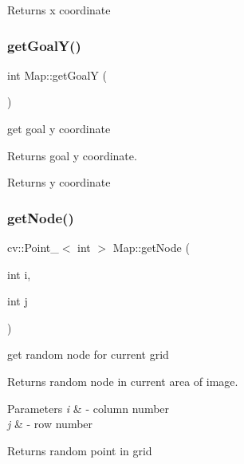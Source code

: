 \begin{DoxyReturn}{Returns}
x coordinate 
\end{DoxyReturn}
\mbox{\label{classMap_ac1ebda149c98e2226e66238a56d337c4}} 
\subsubsection{\texorpdfstring{get\+Goal\+Y()}{getGoalY()}}
{\footnotesize\ttfamily int Map\+::get\+GoalY (\begin{DoxyParamCaption}{ }\end{DoxyParamCaption})}



get goal y coordinate 

Returns goal y coordinate.

\begin{DoxyReturn}{Returns}
y coordinate 
\end{DoxyReturn}
\mbox{\label{classMap_aa0047c676dba81c3475e809b34620819}} 
\subsubsection{\texorpdfstring{get\+Node()}{getNode()}}
{\footnotesize\ttfamily cv\+::\+Point\+\_\+$<$ int $>$ Map\+::get\+Node (\begin{DoxyParamCaption}\item[{int}]{i,  }\item[{int}]{j }\end{DoxyParamCaption})}



get random node for current grid 

Returns random node in current area of image.


\begin{DoxyParams}{Parameters}
{\em i} & -\/ column number \\
\hline
{\em j} & -\/ row number \\
\hline
\end{DoxyParams}
\begin{DoxyReturn}{Returns}
random point in grid 
\end{DoxyReturn}
\mbox{\label{classMap_ae3ece0230fd6a74d2437ec33674466dd}} 
